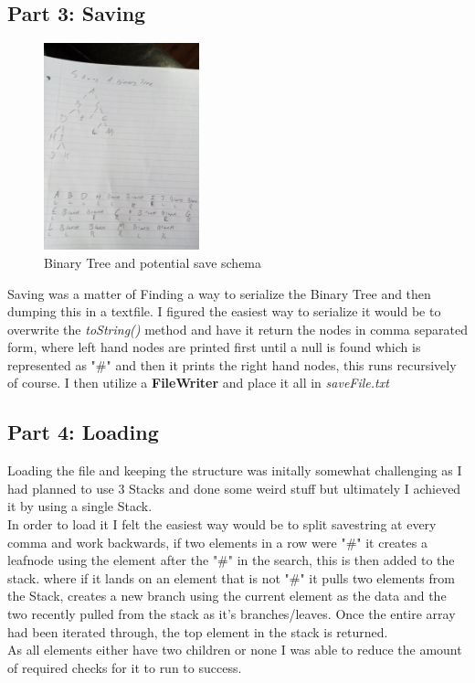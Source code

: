 \documentclass{article}
\begin{document}
	\subsection{Part 3: Saving}
	\begin{figure}[h!]
	\centering
	\includegraphics[width=0.4\textwidth]{btree.jpg}
	\caption{Binary Tree and potential save schema}
	\end{figure}
	Saving was a matter of Finding a way to serialize the Binary Tree and then dumping this in a textfile. I figured the easiest way to serialize it would be to overwrite the \textit{toString()} method and have it return the nodes in comma separated form, where left hand nodes are printed first until a null is found which is represented as "\#" and then it prints the right hand nodes, this runs recursively of course. I then utilize a \textbf{FileWriter} and place it all in \textit{saveFile.txt}
	\subsection{Part 4: Loading}
	Loading the file and keeping the structure was initally somewhat challenging as I had planned to use 3 Stacks and done some weird stuff but ultimately I achieved it by using a single Stack.\\
	In order to load it I felt the easiest way would be to split savestring at every comma and work backwards, if two elements in a row were "\#" it creates a leafnode using the element after the "\#" in the search, this is then added to the stack. where if it lands on an element that is not "\#" it pulls two elements from the Stack, creates a new branch using the current element as the data and the two recently pulled from the stack as it's branches/leaves. Once the entire array had been iterated through, the top element in the stack is returned.\\
	As all elements either have two children or none I was able to reduce the amount of required checks for it to run to success.
	\newpage
\end{document}
